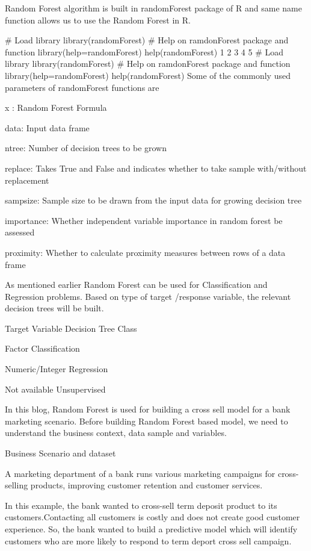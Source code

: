 Random Forest algorithm is built in randomForest package of R and same name function allows us to use the Random Forest in R.


# Load library
library(randomForest)
# Help on ramdonForest package and function
library(help=randomForest)
help(randomForest)
1
2
3
4
5
# Load library
library(randomForest)
# Help on ramdonForest package and function
library(help=randomForest)
help(randomForest)
Some of the commonly used parameters of randomForest functions are

x : Random Forest Formula

data: Input data frame

ntree: Number of decision trees to be grown

replace: Takes True and False and indicates whether to take sample with/without replacement

sampsize: Sample size to be drawn from the input data for growing decision tree

importance: Whether independent variable importance in random forest be assessed

proximity: Whether to calculate proximity measures between rows of a data frame

 

As mentioned earlier Random Forest can be used for Classification and Regression problems. Based on type of target /response variable, the relevant decision trees will be built.

Target Variable                                                               Decision Tree Class

Factor                                                                                        Classification

Numeric/Integer                                                                     Regression

Not available                                                                            Unsupervised

In this blog, Random Forest is used for building a cross sell model for a bank marketing scenario. Before building Random Forest based model, we need to understand the business context, data sample and variables.

Business Scenario and dataset

A marketing department of a bank runs various marketing campaigns for cross-selling products, improving customer retention and customer services.

In this example, the bank wanted to cross-sell term deposit product to its customers.Contacting all customers is costly and does not create good customer experience. So, the bank wanted to build a predictive model which will identify customers who are more likely to respond to term deport cross sell campaign.


